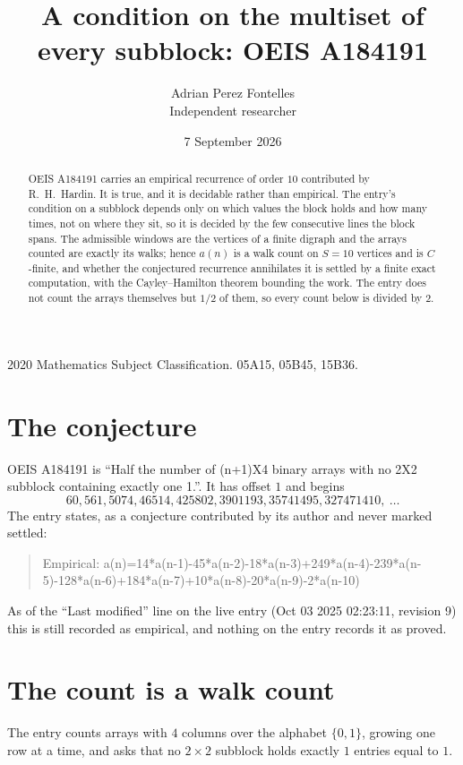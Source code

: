 \documentclass[11pt,a4paper]{article}
\title{A condition on the multiset of every subblock: OEIS A184191}
\author{Adrian Perez Fontelles\\ \small Independent researcher}
\date{7 September 2026}
\theoremstyle{plain}
\theoremstyle{definition}
\begin{document}
\maketitle

\begin{abstract}
OEIS A184191 carries an empirical recurrence of order $10$ contributed by R.~H.~Hardin. It is
true, and it is decidable rather than empirical. The entry's condition on a subblock depends
only on which values the block holds and how many times, not on where they sit, so it is
decided by the few consecutive lines the block spans. The admissible windows are the vertices
of a finite digraph and the arrays counted are exactly its walks; hence $a(n)$ is a walk count
on $S=10$ vertices and is $C$-finite, and whether the conjectured recurrence annihilates it
is settled by a finite exact computation, with the Cayley--Hamilton theorem bounding the
work. The entry does not count the arrays themselves but $1/2$ of them, so every count below is divided by $2$.
\end{abstract}

\noindent\small 2020 Mathematics Subject Classification. 05A15, 05B45, 15B36.\normalsize

\section{The conjecture}

OEIS A184191 is ``Half the number of (n+1)X4 binary arrays with no 2X2 subblock containing exactly one 1.''. It has offset $1$ and begins
\[
60, 561, 5074, 46514, 425802, 3901193, 35741495, 327471410,\ \dots
\]
The entry states, as a conjecture contributed by its author and never marked settled:
\begin{quote}
Empirical: a(n)=14*a(n-1)-45*a(n-2)-18*a(n-3)+249*a(n-4)-239*a(n-5)-128*a(n-6)+184*a(n-7)+10*a(n-8)-20*a(n-9)-2*a(n-10)
\end{quote}
As of the ``Last modified'' line on the live entry (Oct 03 2025 02:23:11, revision 9) this is still
recorded as empirical, and nothing on the entry records it as proved.

\section{The count is a walk count}

The entry counts arrays with $4$ columns over the alphabet $\{0,1\}$, growing one row at a time, and asks that no $2\times2$ subblock holds exactly $1$ entries equal to $1$.
\end{document}
